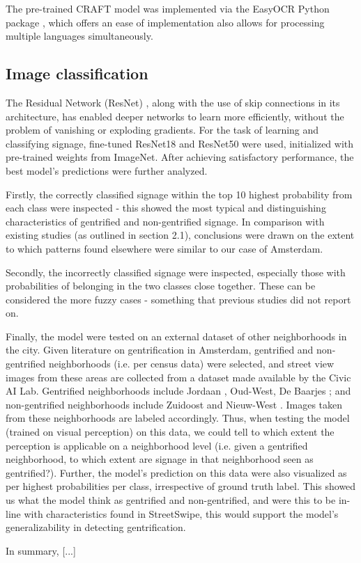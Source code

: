 The pre-trained CRAFT model was implemented via the EasyOCR Python package \cite{noauthor_jaided_nodate}, which offers an ease of implementation also allows for processing multiple languages simultaneously.

\subsection{Image classification}
The Residual Network (ResNet) \cite{resnet}, along with the use of skip connections in its architecture, has enabled deeper networks to learn more efficiently, without the problem of vanishing or exploding gradients. For the task of learning and classifying signage, fine-tuned ResNet18 and ResNet50 were used, initialized with pre-trained weights from ImageNet. After achieving satisfactory performance, the best model's predictions were further analyzed. 

Firstly, the correctly classified signage within the top 10 highest probability from each class were inspected - this showed the most typical and distinguishing characteristics of gentrified and non-gentrified signage. In comparison with existing studies (as outlined in section 2.1), conclusions were drawn on the extent to which patterns found elsewhere were similar to our case of Amsterdam.

Secondly, the incorrectly classified signage were inspected, especially those with probabilities of belonging in the two classes close together. These can be considered the more fuzzy cases - something that previous studies did not report on.

Finally, the model were tested on an external dataset of other neighborhoods in the city. Given literature on gentrification in Amsterdam, gentrified and non-gentrified neighborhoods (i.e. per census data) were selected, and street view images from these areas are collected from a dataset made available by the Civic AI Lab. Gentrified neighborhoods include Jordaan \cite{verlaan_hippies_2022}, Oud-West, De Baarjes \cite{rettberg_when_2019}; and non-gentrified neighborhoods include Zuidoost and Nieuw-West \cite{pinkster_stickiness_2020}. Images taken from these neighborhoods are labeled accordingly. Thus, when testing the model (trained on visual perception) on this data, we could tell to which extent the perception is applicable on a neighborhood level (i.e. given a gentrified neighborhood, to which extent are signage in that neighborhood seen as gentrified?). Further, the model's prediction on this data were also visualized as per highest probabilities per class, irrespective of ground truth label. This showed us what the model think as gentrified and non-gentrified, and were this to be in-line with characteristics found in StreetSwipe, this would support the model's generalizability in detecting gentrification.

In summary, [...]
